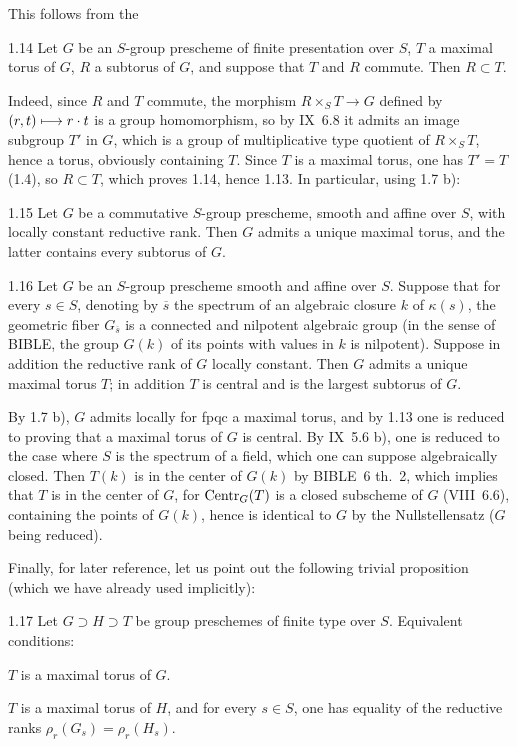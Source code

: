 This follows from the
\begin{lemma}{1.14}\label{XII.1.14}
Let $G$ be an $S$-group prescheme of finite presentation over $S$, $T$ a maximal torus of $G$, $R$ a subtorus of $G$, and suppose that $T$ and $R$ commute. Then $R\subset T$.
\end{lemma}
Indeed, since $R$ and $T$ commute, the morphism $R\times_S T\to G$ defined by $(r,t)\longmapsto r\cdot t$ is a group homomorphism, so by IX~6.8 it admits an image subgroup $T'$ in $G$, which is a group of multiplicative type quotient of $R\times_S T$, hence a torus, obviously containing $T$. Since $T$ is a maximal torus, one has $T'=T$ (1.4), so $R\subset T$, which proves 1.14, hence 1.13. In particular, using 1.7 b):
\begin{corollary}{1.15}\label{XII.1.15}
Let $G$ be a commutative $S$-group prescheme, smooth and affine over $S$, with locally constant reductive rank. Then $G$ admits a unique maximal torus, and the latter contains every subtorus of $G$.
\end{corollary}
\begin{corollary}{1.16}\label{XII.1.16}
Let $G$ be an $S$-group prescheme smooth and affine over $S$. Suppose that for every $s\in S$, denoting by $\overline s$ the spectrum of an algebraic closure $k$ of $\kappa(s)$, the geometric fiber $G_{\overline s}$ is a connected and nilpotent algebraic group (in the sense of BIBLE, \ie the group $G(k)$ of its points with values in $k$ is nilpotent). Suppose in addition the reductive rank of $G$ locally constant. Then $G$ admits a unique maximal torus $T$; in addition $T$ is central and is the largest subtorus of $G$.
\end{corollary}
By 1.7 b), $G$ admits locally for fpqc a maximal torus, and by 1.13 one is reduced to proving that a maximal torus of $G$ is central. By IX~5.6 b), one is reduced to the case where $S$ is the spectrum of a field, which one can suppose algebraically closed. Then $T(k)$ is in the center of $G(k)$ by BIBLE~6 th.~2, which implies that $T$ is in the center of $G$, for $\operatorname{Centr}_G(T)$ is a closed subscheme of $G$ (VIII~6.6), containing the points of $G(k)$, hence is identical to $G$ by the Nullstellensatz ($G$ being reduced).

Finally, for later reference, let us point out the following trivial proposition (which we have already used implicitly):
\begin{proposition}{1.17}\label{XII.1.17}
Let $G\supset H\supset T$ be group preschemes of finite type over $S$. Equivalent conditions:
\begin{enumeratei}
\item $T$ is a maximal torus of $G$.
\item $T$ is a maximal torus of $H$, and for every $s\in S$, one has equality of the reductive ranks $\rho_r(G_s)=\rho_r(H_s)$.
\end{enumeratei}
\end{proposition}

